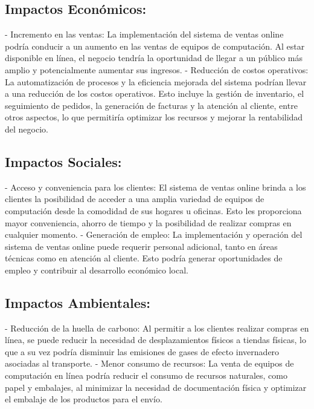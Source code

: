 \documentclass[12pt,a4paper]{article}
\newcommand{\newsubsection}[1]{\subsection{\hspace{4mm} #1}}
\begin{document}
\subsection*{Impactos Económicos:}
   - Incremento en las ventas: La implementación del sistema de ventas online podría conducir a un aumento en las ventas de equipos de computación. Al estar disponible en línea, el negocio tendría la oportunidad de llegar a un público más amplio y potencialmente aumentar sus ingresos.
   - Reducción de costos operativos: La automatización de procesos y la eficiencia mejorada del sistema podrían llevar a una reducción de los costos operativos. Esto incluye la gestión de inventario, el seguimiento de pedidos, la generación de facturas y la atención al cliente, entre otros aspectos, lo que permitiría optimizar los recursos y mejorar la rentabilidad del negocio.

\subsection*{Impactos Sociales:}
   - Acceso y conveniencia para los clientes: El sistema de ventas online brinda a los clientes la posibilidad de acceder a una amplia variedad de equipos de computación desde la comodidad de sus hogares u oficinas. Esto les proporciona mayor conveniencia, ahorro de tiempo y la posibilidad de realizar compras en cualquier momento.
   - Generación de empleo: La implementación y operación del sistema de ventas online puede requerir personal adicional, tanto en áreas técnicas como en atención al cliente. Esto podría generar oportunidades de empleo y contribuir al desarrollo económico local.

\subsection*{Impactos Ambientales:}
   - Reducción de la huella de carbono: Al permitir a los clientes realizar compras en línea, se puede reducir la necesidad de desplazamientos físicos a tiendas físicas, lo que a su vez podría disminuir las emisiones de gases de efecto invernadero asociadas al transporte.
   - Menor consumo de recursos: La venta de equipos de computación en línea podría reducir el consumo de recursos naturales, como papel y embalajes, al minimizar la necesidad de documentación física y optimizar el embalaje de los productos para el envío.

%
%
%
\end{document}
